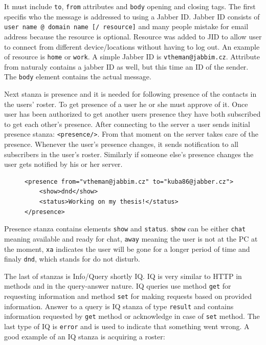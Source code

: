 It must include \verb|to|, \verb|from| attributes and \verb|body| opening and closing tags. The first specifis who the message is addressed to using a Jabber ID. Jabber ID consists of \newline\verb|user name @ domain name [/ resource]| and many people mistake for email address because the resource is optional. Resource was added to JID to allow user to connect from different device/locations without having to log out. An example of resource is \verb|home| or \verb|work|. A simple Jabber ID is \verb|vtheman@jabbim.cz|. Attribute from naturaly contains a jabber ID as well, but this time an ID of the sender. The \verb|body| element contains the actual message. 

Next stanza is presence and it is needed for following presence of the contacts in the users' roster. To get presence of a user he or she must approve of it. Once user has been authorized to get another users presence they have both subscribed to get each other's presence. After connecting to the server a user sends initial presence stanza: \verb|<presence/>|. From that moment on the server takes care of the presence. Whenever the user's presence changes, it sends notification to all subscribers in the user's roster. Similarly if someone else's presence changes the user gets notified by his or her server. 

\begin{figure}[h]
\begin{lstlisting}
<presence from="vtheman@jabbim.cz" to="kuba86@jabber.cz">
	<show>dnd</show>
	<status>Working on my thesis!</status>
</presence>
\end{lstlisting}
\end{figure}

Presence stanza contains elements \verb|show| and \verb|status|. \verb|show| can be either \verb|chat| meaning available and ready for chat, \verb|away| meaning the user is not at the PC at the moment, \verb|xa| indicates the user will be gone for a longer period of time and finaly \verb|dnd|, which stands for do not disturb.  

The last of stanzas is Info/Query shortly IQ. IQ is very similar to HTTP in methods and in the query-answer nature. IQ queries use method \verb|get| for requesting information and method \verb|set| for making requests based on provided information. Answer to a query is IQ stanza of type \verb|result| and contains information requested by \verb|get| method or acknowledge in case of \verb|set| method. The last type of IQ is \verb|error| and is used to indicate that something went wrong. A good example of an IQ stanza is acquiring a roster: 

